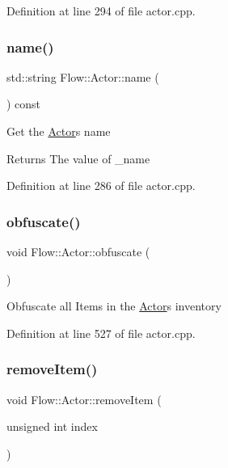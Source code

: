 Definition at line 294 of file actor.\+cpp.

\hypertarget{class_flow_1_1_actor_a66f88663ad38508b09e53115608dd0f7}{}\label{class_flow_1_1_actor_a66f88663ad38508b09e53115608dd0f7} 
\subsubsection{\texorpdfstring{name()}{name()}\hspace{0.1cm}{\footnotesize\ttfamily [2/2]}}
{\footnotesize\ttfamily std\+::string Flow\+::\+Actor\+::name (\begin{DoxyParamCaption}{ }\end{DoxyParamCaption}) const}

Get the \hyperlink{class_flow_1_1_actor}{Actor}\textquotesingle{}s name \begin{DoxyReturn}{Returns}
The value of \+\_\+name 
\end{DoxyReturn}


Definition at line 286 of file actor.\+cpp.

\hypertarget{class_flow_1_1_actor_aea7ee4b2807325b9c4f9f394fb2c22c1}{}\label{class_flow_1_1_actor_aea7ee4b2807325b9c4f9f394fb2c22c1} 
\subsubsection{\texorpdfstring{obfuscate()}{obfuscate()}}
{\footnotesize\ttfamily void Flow\+::\+Actor\+::obfuscate (\begin{DoxyParamCaption}{ }\end{DoxyParamCaption})}

Obfuscate all Items in the \hyperlink{class_flow_1_1_actor}{Actor}\textquotesingle{}s inventory 

Definition at line 527 of file actor.\+cpp.

\hypertarget{class_flow_1_1_actor_a012c1fd5768e2781aab76dea7d29d7c5}{}\label{class_flow_1_1_actor_a012c1fd5768e2781aab76dea7d29d7c5} 
\subsubsection{\texorpdfstring{remove\+Item()}{removeItem()}}
{\footnotesize\ttfamily void Flow\+::\+Actor\+::remove\+Item (\begin{DoxyParamCaption}\item[{unsigned int}]{index }\end{DoxyParamCaption})}

